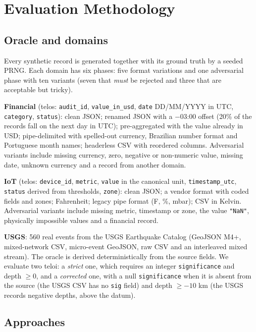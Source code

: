 \documentclass[sigconf,nonacm]{acmart}
\begin{document}
\section{Evaluation Methodology}
\label{sec:method}

\subsection{Oracle and domains}

Every synthetic record is generated together with its ground truth by a seeded PRNG. Each domain has six phases: five format variations and one adversarial phase with ten variants (seven that \textit{must} be rejected and three that are acceptable but tricky).

\textbf{Financial} (telos: \texttt{audit\_\allowbreak id}, \texttt{value\_\allowbreak in\_\allowbreak usd}, \texttt{date} DD/MM/YYYY in UTC, \texttt{category}, \texttt{status}): clean JSON; renamed JSON with a $-$03:00 offset (20\% of the records fall on the next day in UTC); pre-aggregated with the value already in USD; pipe-delimited with spelled-out currency, Brazilian number format and Portuguese month names; headerless CSV with reordered columns. Adversarial variants include missing currency, zero, negative or non-numeric value, missing date, unknown currency and a record from another domain.

\textbf{IoT} (telos: \texttt{device\_id}, \texttt{metric}, \texttt{value} in the canonical unit, \texttt{timestamp\_utc}, \texttt{status} derived from thresholds, \texttt{zone}): clean JSON; a vendor format with coded fields and zones; Fahrenheit; legacy pipe format (F, \%, mbar); CSV in Kelvin. Adversarial variants include missing metric, timestamp or zone, the value \texttt{"NaN"}, physically impossible values and a financial record.

\textbf{USGS}: 560 real events from the USGS Earthquake Catalog (GeoJSON M4+, mixed-network CSV, micro-event GeoJSON, raw CSV and an interleaved mixed stream). The oracle is derived deterministically from the source fields. We evaluate two teloi: a \textit{strict} one, which requires an integer \texttt{significance} and depth $\geq 0$, and a \textit{corrected} one, with a null \texttt{significance} when it is absent from the source (the USGS CSV has no \texttt{sig} field) and depth $\geq -10$ km (the USGS records negative depths, above the datum).

\subsection{Approaches}
\end{document}
